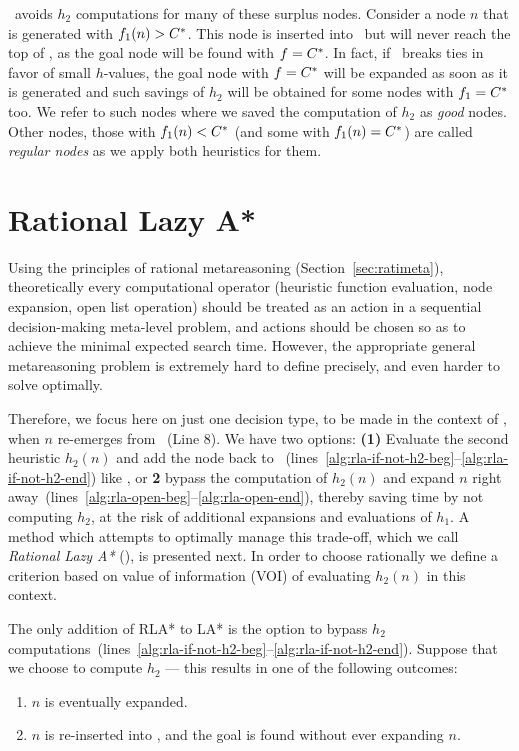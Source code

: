 \lazyastar~avoids $h_2$ computations for many of these surplus nodes. Consider
a node $n$ that is generated with $f_1(n) > C^\ast$. This node is inserted
into \OPEN~but will never reach the top of \OPEN, as the goal node will be found
with $f=C^\ast$. In fact, if \OPEN~breaks ties in favor of small $h$-values,
the goal node with $f=C^\ast$ will be expanded as soon as it is generated and such
savings of $h_2$ will be obtained for some nodes with $f_1=C^\ast$ too. We
refer to such nodes where we saved the computation of $h_2$ as {\em good} nodes. Other nodes,
those with $f_1(n) < C^\ast$ (and some with $f_1(n) = C^\ast$) are called
{\em regular nodes} as we apply both heuristics for them.

\section{Rational Lazy A*}

Using the principles of rational metareasoning (Section~\ref{sec:ratimeta}),
theoretically every computational operator (heuristic function evaluation, node
expansion, open list operation) should be treated as an action in a sequential
decision-making meta-level problem, and actions should be chosen so as to
achieve the minimal expected search time. However, the appropriate
general metareasoning problem is extremely hard to define precisely, and even harder
to solve optimally.

Therefore, we focus here on just one decision type, to be made in the
context of \lazyastar, when $n$ re-emerges from \OPEN~(Line 8).  We
have two options: {\bf (1)} Evaluate the second heuristic $h_2(n)$ and
add the node back to \OPEN~(lines~\ref{alg:rla-if-not-h2-beg}--\ref{alg:rla-if-not-h2-end}) like \lazyastar, or {\bf 2}
bypass the computation of $h_2(n)$ and expand $n$ right away~(lines~\ref{alg:rla-open-beg}--\ref{alg:rla-open-end}), thereby saving time by not computing $h_2$, at the risk of
additional expansions and evaluations of $h_1$.  A method which
attempts to optimally manage this trade-off, which we
call \textit{Rational Lazy A*} (\rationallazyastar), is presented
next.  In order to choose rationally we define a criterion based on
value of information (VOI) of evaluating $h_2(n)$ in this context.

The only addition of RLA* to LA* is the option to bypass $h_2$ computations~(lines~\ref{alg:rla-if-not-h2-beg}--\ref{alg:rla-if-not-h2-end}).
Suppose that we choose to compute $h_2$ --- this results in one of the
following outcomes:
\begin{enumerate}
\item $n$ is eventually expanded.
\item $n$ is re-inserted into \OPEN, and the goal is found without ever expanding $n$.
\end{enumerate}

